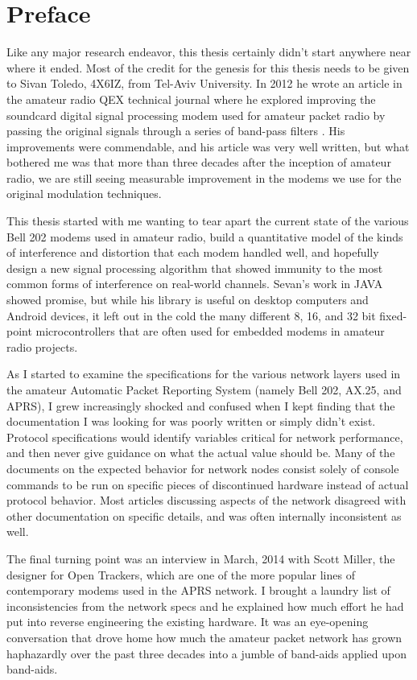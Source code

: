 \chapter{Preface}

Like any major research endeavor, this thesis certainly didn't start anywhere near
where it ended.
Most of the credit for the genesis for this thesis needs to be given to 
Sivan Toledo, 4X6IZ, from Tel-Aviv University. In 2012 he wrote an article in the
amateur radio QEX technical journal where he explored improving the soundcard 
digital signal processing modem used for amateur packet radio by passing the 
original signals through a series of band-pass filters \cite{sevanhighperf}. 
His improvements were
commendable, and his article was very well written, but what bothered me was that 
more than three decades after the inception of amateur radio, we are still seeing
measurable improvement in the modems we use for the original modulation techniques.

This thesis started with me wanting to tear apart the current state of the various
Bell 202 modems used in amateur radio, build a quantitative model of the kinds of
interference and distortion that each modem handled well, and hopefully design
a new signal processing algorithm that showed immunity to the most common forms of
interference on real-world channels. Sevan's work in JAVA showed promise, but 
while his library is useful on desktop computers and Android devices, it left 
out in the cold the many different 8, 16, and 32 bit fixed-point microcontrollers
that are often used for embedded modems in amateur radio projects.

As I started to examine the specifications for the various network layers used
in the amateur Automatic Packet Reporting System (namely Bell 202, AX.25, and
APRS), I grew increasingly shocked and confused when I kept finding that the
documentation I was looking for was poorly written or simply didn't exist. 
Protocol specifications would identify variables critical for network performance,
and then never give guidance on what the actual value should be.
Many of the documents
on the expected behavior for network nodes consist solely of console commands
to be run on specific pieces of discontinued hardware instead of actual protocol
behavior.
Most articles discussing aspects of the network disagreed with 
other documentation on specific details,
and was often internally inconsistent as well.

The final turning point was an interview in March, 2014 with Scott Miller, the
designer for Open Trackers, 
which are one of the more popular lines of contemporary modems used in the APRS
network.
I brought a laundry list of inconsistencies from the network specs and he
explained how much effort he had put into reverse engineering the existing 
hardware. It was an eye-opening conversation that drove home how much the 
amateur packet network has grown haphazardly over the past three decades into
a jumble of band-aids applied upon band-aids.

